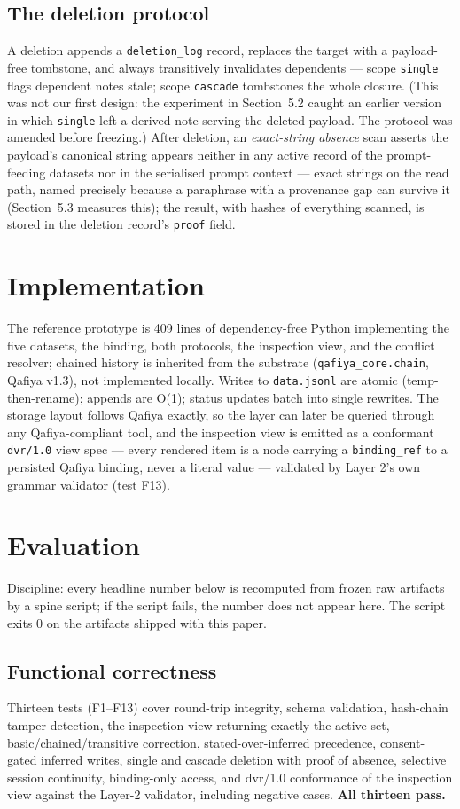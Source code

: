 \documentclass[11pt]{article}
\begin{document}
\subsection{The deletion protocol}
A deletion appends a \texttt{deletion\_log} record, replaces the target with a payload-free tombstone, and always transitively invalidates dependents --- scope \texttt{single} flags dependent notes stale; scope \texttt{cascade} tombstones the whole closure. (This was not our first design: the experiment in Section~5.2 caught an earlier version in which \texttt{single} left a derived note serving the deleted payload. The protocol was amended before freezing.) After deletion, an \emph{exact-string absence} scan asserts the payload's canonical string appears neither in any active record of the prompt-feeding datasets nor in the serialised prompt context --- exact strings on the read path, named precisely because a paraphrase with a provenance gap can survive it (Section~5.3 measures this); the result, with hashes of everything scanned, is stored in the deletion record's \texttt{proof} field.

\section{Implementation}
The reference prototype is 409 lines of dependency-free Python implementing the five datasets, the binding, both protocols, the inspection view, and the conflict resolver; chained history is inherited from the substrate (\texttt{qafiya\_core.chain}, Qafiya v1.3), not implemented locally. Writes to \texttt{data.jsonl} are atomic (temp-then-rename); appends are O(1); status updates batch into single rewrites. The storage layout follows Qafiya exactly, so the layer can later be queried through any Qafiya-compliant tool, and the inspection view is emitted as a conformant \texttt{dvr/1.0} view spec --- every rendered item is a node carrying a \texttt{binding\_ref} to a persisted Qafiya binding, never a literal value --- validated by Layer 2's own grammar validator (test F13).

\section{Evaluation}
\label{sec:eval}
Discipline: every headline number below is recomputed from frozen raw artifacts by a spine script; if the script fails, the number does not appear here. The script exits 0 on the artifacts shipped with this paper.

\subsection{Functional correctness}
Thirteen tests (F1--F13) cover round-trip integrity, schema validation, hash-chain tamper detection, the inspection view returning exactly the active set, basic/chained/transitive correction, stated-over-inferred precedence, consent-gated inferred writes, single and cascade deletion with proof of absence, selective session continuity, binding-only access, and dvr/1.0 conformance of the inspection view against the Layer-2 validator, including negative cases. \textbf{All thirteen pass.}
\end{document}

